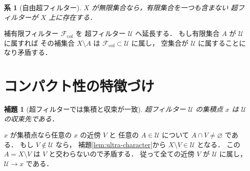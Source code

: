 \documentclass[a5paper,10pt,onecolumn]{jsarticle}
\makeatletter
\theoremstyle{mathnotetheorem}
\newtheorem{lemma}[theorem]{補題}
\newtheorem{corollary}[theorem]{系}
\renewcommand{\proofname}{証明}
\renewenvironment{proof}[1][\proofname]{%
  \par\pushQED{\qed}\normalfont\topsep4\p@\@plus2\p@\relax
  \trivlist\item[\hskip\labelsep\bfseries #1]\ignorespaces
}{\popQED\endtrivlist\@endpefalse}
\makeatother
\begin{document}
\begin{corollary}[自由超フィルター]\label{cor:free-ultra}
$X$ が無限集合なら，有限集合を一つも含まない
超フィルターが $X$ 上に存在する．
\end{corollary}
\begin{proof}
補有限フィルター $\mathcal F_{\mathrm{cof}}$ を
超フィルター $\mathcal U$ へ延長する．
もし有限集合 $A$ が $\mathcal U$ に属すれば
その補集合 $X\setminus A$ は
$\mathcal F_{\mathrm{cof}}\subset\mathcal U$ に属し，
空集合が $\mathcal U$ に属することになり矛盾する．
\end{proof}

\section{コンパクト性の特徴づけ}

\begin{lemma}[超フィルターでは集積と収束が一致]
\label{lem:ultra-cluster}
超フィルター $\mathcal U$ の集積点 $x$ は
$\mathcal U$ の収束先である．
\end{lemma}
\begin{proof}
$x$ が集積点なら任意の $x$ の近傍 $V$ と
任意の $A\in\mathcal U$ について
$A\cap V\ne\varnothing$ である．
もし $V\notin\mathcal U$ なら，
補題\ref{lem:ultra-character}から
$X\setminus V\in\mathcal U$ となる．
この $A=X\setminus V$ は $V$ と交わらないので矛盾する．
従って全ての近傍 $V$ が $\mathcal U$ に属し，
$\mathcal U\to x$ である．
\end{proof}
\end{document}
